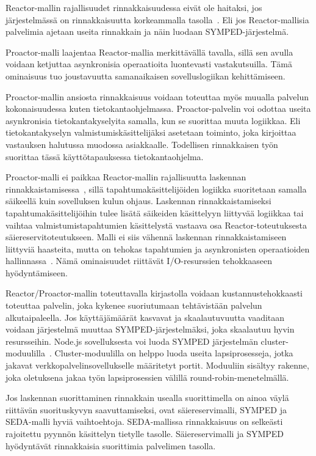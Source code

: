 \documentclass[finnish]{tktltiki2}
\theoremstyle{definition}
\theoremstyle{remark}
\begin{document}
Reactor-mallin rajallisuudet rinnakkaisuudessa
eivät ole haitaksi, jos järjestelmässä on rinnakkaisuutta
korkeammalla tasolla~\cite{schmidt_reactor:_1995}. Eli
jos Reactor-mallisia palvelimia ajetaan useita rinnakkain
ja näin luodaan SYMPED-järjestelmä.

Proactor-malli laajentaa Reactor-mallia merkittävällä tavalla,
sillä sen avulla voidaan ketjuttaa asynkronisia
operaatioita luontevasti vastakutsuilla. Tämä ominaisuus
tuo joustavuutta samanaikaisen sovelluslogiikan kehittämiseen.

Proactor-mallin ansiosta rinnakkaisuus
voidaan toteuttaa myös 
muualla palvelun kokonaisuudessa kuten tietokantaohjelmassa.
Proactor-palvelin voi odottaa useita asynkronisia
tietokantakyselyita samalla, kun se suorittaa
muuta logiikkaa. Eli tietokantakyselyn valmistumiskäsittelijäksi
asetetaan toiminto, joka kirjoittaa vastauksen
halutussa muodossa asiakkaalle.
Todellisen rinnakkaisen työn
suorittaa tässä käyttötapauksessa tietokantaohjelma.

Proactor-malli ei paikkaa
Reactor-mallin rajallisuutta laskennan rinnakkaistamisessa~\cite{pyarali_proactor_1997},
sillä tapahtumakäsittelijöiden logiikka suoritetaan
samalla säikeellä kuin sovelluksen kulun ohjaus.
Laskennan rinnakkaistamiseksi tapahtumakäsittelijöihin
tulee lisätä säikeiden käsittelyyn liittyvää logiikkaa
tai vaihtaa valmistumistapahtumien käsittelystä vastaava
osa Reactor-toteutuksesta säiereservitoteutukseen.
Malli ei siis vähennä laskennan rinnakkaistamiseen liittyviä
haasteita, mutta on tehokas tapahtumien ja asynkronisten
operaatioiden hallinnassa~\cite{hu_applying_1998}.
Nämä ominaisuudet riittävät
I/O-resurssien tehokkaaseen hyödyntämiseen.

Reactor/Proactor-mallin toteuttavalla
kirjastolla voidaan kustannustehokkaasti
toteuttaa palvelin, joka kykenee suoriutumaan
tehtävistään palvelun alkutaipaleella. Jos
käyttäjämäärät kasvavat ja skaalautuvuutta
vaaditaan voidaan järjestelmä muuttaa SYMPED-järjestelmäksi,
joka skaalautuu hyvin resursseihin.
Node.js sovelluksesta voi luoda SYMPED järjestelmän
cluster-moduulilla~\cite{noauthor_cluster_nodate}.
Cluster-moduulilla on helppo luoda useita lapsiprosesseja,
jotka jakavat verkkopalvelinsovellukselle määritetyt
portit. Moduuliin sisältyy rakenne,
joka oletuksena jakaa työn lapsiprosessien välillä
round-robin-menetelmällä.

Jos laskennan suorittaminen rinnakkain usealla suorittimella
on ainoa väylä riittävän suorituskyvyn saavuttamiseksi,
ovat säiereservimalli, SYMPED ja SEDA-malli hyviä vaihtoehtoja.
SEDA-mallissa rinnakkaisuus on selkeästi rajoitettu
pyynnön käsittelyn tietylle tasolle. Säiereservimalli ja SYMPED
hyödyntävät rinnakkaisia suorittimia palvelimen tasolla.
\end{document}
